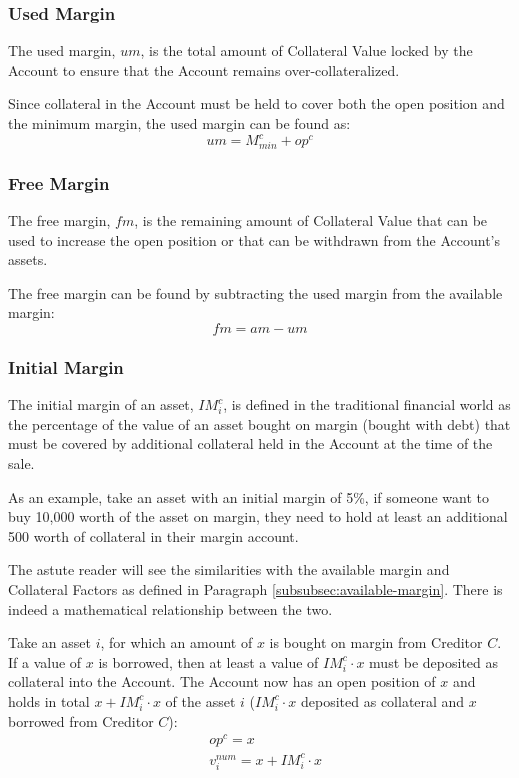\documentclass[sigconf,nonacm]{acmart}
\begin{document}
\subsubsection{Used Margin}
The used margin, $um$, is the total amount of Collateral Value locked by the Account to ensure that the Account remains over-collateralized.

Since collateral in the Account must be held to cover both the open position and the minimum margin, the used margin can be found as:
\begin{equation}
    um = M_{min}^c + op^c
\end{equation}

\subsubsection{Free Margin}
The free margin, $fm$, is the remaining amount of Collateral Value that can be used to increase the open position or that can be withdrawn from the Account's assets.

The free margin can be found by subtracting the used margin from the available margin:
\begin{equation}
    \label{eq:free-margin}
    fm = am - um
\end{equation}

\subsubsection{Initial Margin}
\label{subsubsec:initial-margin}
The initial margin of an asset, $IM_{i}^{c}$, is defined in the traditional financial world as the percentage of the value of an asset bought on margin (bought with debt)
that must be covered by additional collateral held in the Account at the time of the sale.

As an example, take an asset with an initial margin of 5\%, if someone want to buy 10,000 worth of the asset on margin,
they need to hold at least an additional 500 worth of collateral in their margin account.

The astute reader will see the similarities with the available margin and Collateral Factors as defined in Paragraph \ref{subsubsec:available-margin}.
There is indeed a mathematical relationship between the two.

Take an asset $i$, for which an amount of $x$ is bought on margin from Creditor $C$.
If a value of $x$ is borrowed, then at least a value of $IM_{i}^{c} \cdot x$ must be deposited as collateral into the Account.
The Account now has an open position of $x$ and holds in total $x + IM_{i}^{c} \cdot x$ of the asset $i$ ($IM_{i}^{c} \cdot x$ deposited as collateral and $x$ borrowed from Creditor $C$):
\begin{equation}
    \label{eq:initial-margin}
    \begin{split}
        &op^c = x\\
        &v^{num}_i = x + IM_{i}^{c} \cdot x
    \end{split}
\end{equation}
\end{document}
